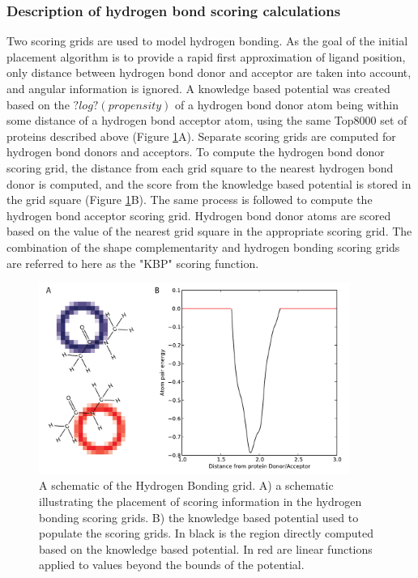 \subsubsection{Description of hydrogen bond scoring calculations}

Two scoring grids are used to model hydrogen bonding.
As the goal of the initial placement algorithm is to provide a rapid first approximation of ligand position, only distance between hydrogen bond donor and acceptor are taken into account, and angular information is ignored.
A knowledge based potential was created based on the $?log?(propensity)$ of a hydrogen bond donor atom being within some distance of a hydrogen bond acceptor atom, using the same Top8000 set of proteins described above (Figure \ref{fig:hbond_schematic}A).
Separate scoring grids are computed for hydrogen bond donors and acceptors. To compute the hydrogen bond donor scoring grid, the distance from each grid square to the nearest hydrogen bond donor is computed, and the score from the knowledge based potential is stored in the grid square (Figure \ref{fig:hbond_schematic}B).
The same process is followed to compute the hydrogen bond acceptor scoring grid.
Hydrogen bond donor atoms are scored based on the value of the nearest grid square in the appropriate scoring grid.  
The combination of the shape complementarity and hydrogen bonding scoring grids are referred to here as the "\ac{KBP}" scoring function. 
\begin{figure}
\centering
\includegraphics[width=4in]{figures/lowres_appendix/Hydrogen_Bonding.pdf}
\caption{
A schematic of the Hydrogen Bonding grid.
A) a schematic illustrating the placement of scoring information in the hydrogen bonding scoring grids.
B) the knowledge based potential used to populate the scoring grids.
In black is the region directly computed based on the knowledge based potential.  In red are linear functions applied to values beyond the bounds of the potential.
}
\label{fig:hbond_schematic}
\end{figure}

